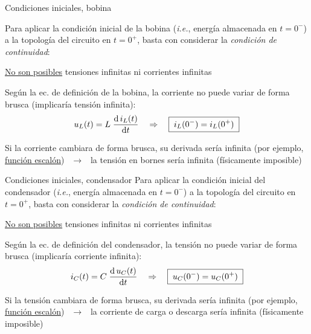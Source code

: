 \documentclass[aspectratio=169, usenames,svgnames,dvipsnames]{beamer}
\begin{document}

\begin{frame}{Condiciones iniciales, \hspace{3mm}bobina} \label{diapo:continuidad_L}

    Para aplicar la \alert{condición inicial} de la bobina (\textit{i.e.}, \alert{energía almacenada} en $t=0^-$) a la topología del circuito en  $t=0^+$, basta con considerar la \alert{\textit{condición de continuidad}}: 

    \begin{center}
        \underline{No son posibles} tensiones infinitas ni corrientes infinitas
    \end{center}
    
        Según la ec. de definición de la bobina, la \alert{corriente no puede variar de forma brusca} (implicaría tensión infinita):
        \[
            u_L(t) = L \; \diff{\, i_L(t)}{t}
            \quad\Rightarrow\quad        
            \boxed{\; i_L(0^-) = i_L(0^+) \;}
        \]
    
    Si la corriente cambiara de forma brusca, su derivada sería infinita (por ejemplo, \hyperlink{diapo:escalon}{función escalón}) $\;\,\rightarrow\;\,$ la tensión en bornes sería infinita (\alert{físicamente imposible})
    
\end{frame}


\begin{frame}{Condiciones iniciales, \hspace{3mm}condensador} \label{diapo:continuidad_C}
    Para aplicar la \alert{condición inicial} del condensador (\textit{i.e.}, \alert{energía almacenada} en $t=0^-$) a la topología del circuito en  $t=0^+$, basta con considerar la \alert{\textit{condición de continuidad}}: 

    \begin{center}
        \underline{No son posibles} tensiones infinitas ni corrientes infinitas
    \end{center}
    
        Según la ec. de definición del condensador, la \alert{tensión no puede variar de forma brusca} (implicaría corriente infinita):
        \[
            i_C(t) = C \; \diff{\, u_C(t)}{t}
            \quad\Rightarrow\quad        
            \boxed{\; u_C(0^-) = u_C(0^+) \;}
        \]
    
    Si la tensión cambiara de forma brusca, su derivada sería infinita (por ejemplo, \hyperlink{diapo:escalon}{función escalón}) $\;\,\rightarrow\;\,$ la corriente de carga o
    descarga sería infinita (\alert{físicamente imposible})
\end{frame}
\end{document}
